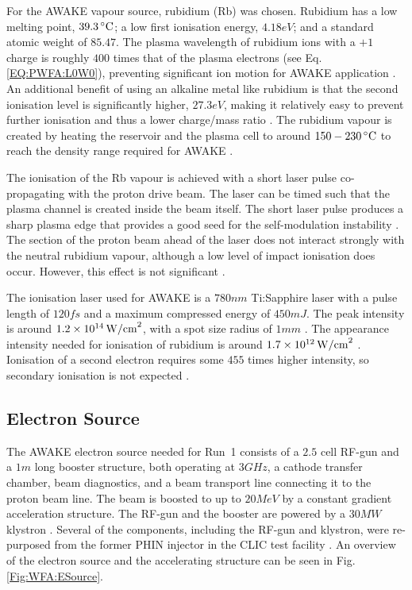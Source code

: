 For the AWAKE vapour source, rubidium (Rb) was chosen. Rubidium has a low melting point, $39.3\celsius$; a low first ionisation energy, $4.18\unit{eV}$; and a standard atomic weight of $85.47$. The plasma wavelength of rubidium ions with a $+1$ charge is roughly $400$ times that of the plasma electrons (see Eq. \ref{EQ:PWFA:L0W0}), preventing significant ion motion for AWAKE application \cite{vieira:2012a}. An additional benefit of using an alkaline metal like rubidium is that the second ionisation level is significantly higher, $27.3\unit{eV}$, making it relatively easy to prevent further ionisation and thus a lower charge/mass ratio \cite{awake_collaboration:2017}. The rubidium vapour is created by heating the reservoir and the plasma cell to around $150-230\celsius$ to reach the density range required for AWAKE \cite{caldwell:2015,muggli:2017a}.

The ionisation of the Rb vapour is achieved with a short laser pulse co-propagating with the proton drive beam. The laser can be timed such that the plasma channel is created inside the beam itself. The short laser pulse produces a sharp plasma edge that provides a good seed for the self-modulation instability \cite{vieira:2014a}. The section of the proton beam ahead of the laser does not interact strongly with the neutral rubidium vapour, although a low level of impact ionisation does occur. However, this effect is not significant \cite{awake_collaboration:2017}.

The ionisation laser used for AWAKE is a $780\unit{nm}$ Ti:Sapphire laser with a pulse length of $120\unit{fs}$ and a maximum compressed energy of $450\unit{mJ}$. The peak intensity is around $1.2\nexp{14}\unit{W/cm}^{2}$, with a spot size radius of $1\unit{mm}$ \cite{awake_collaboration:2017}. The appearance intensity needed for ionisation of rubidium is around $1.7\nexp{12}\unit{W/cm}^{2}$ \cite{augst:1989}. Ionisation of a second electron requires some $455$ times higher intensity, so secondary ionisation is not expected \cite{muggli:2017a}.

\subsection{Electron Source}
\label{WFA:Design:ESource}

The AWAKE electron source needed for Run~1 consists of a $2.5$ cell RF-gun and a $1\unit{m}$ long booster structure, both operating at $3\unit{GHz}$, a cathode transfer chamber, beam diagnostics, and a beam transport line connecting it to the proton beam line. The beam is boosted to up to $20\unit{MeV}$ by a constant gradient acceleration structure. The RF-gun and the booster are powered by a $30\unit{MW}$ klystron \cite{awake_collaboration:2017,pepitone:2016}. Several of the components, including the RF-gun and klystron, were re-purposed from the former PHIN injector in the CLIC test facility \cite{chevallay:2012}. An overview of the electron source and the accelerating structure can be seen in Fig. \ref{Fig:WFA:ESource}.


